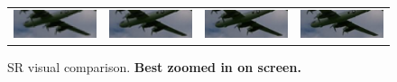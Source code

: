 \documentclass[10pt,twocolumn,letterpaper]{article}
\begin{document}
\begin{figure}
{\begin{tabular}{cccc}
\includegraphics[width=0.1\linewidth]{3096O}&
\includegraphics[width=0.3\linewidth]{3096Z}&
\includegraphics[width=0.3\linewidth]{3096A+}&
\includegraphics[width=0.3\linewidth]{3096I}
\end{tabular}
}
\caption{SR visual comparison. \textbf{Best zoomed in on screen.}}
\label{fig:visual_crops}
\vspace{-0.5cm}
\end{figure}
\end{document}
